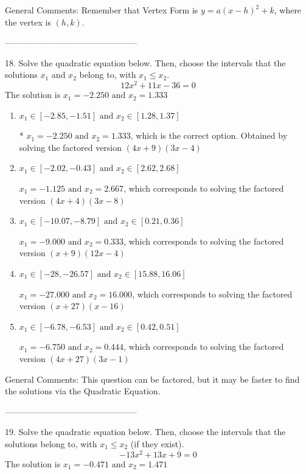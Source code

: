 \documentclass{extbook}[14pt]
\begin{document}
General Comments: Remember that Vertex Form is $y = a(x-h)^2+k$, where the vertex is $(h, k)$.

-----------------------------------------------

18. Solve the quadratic equation below. Then, choose the intervals that the solutions $x_1$ and $x_2$ belong to, with $x_1 \leq x_2$.
\[ 12x^{2} +11 x -36 = 0 \] 
The solution is $ x_1 = -2.250 \text{ and } x_2 = 1.333 $ 

\begin{enumerate}[label=\Alph*.] 
\item $ x_1 \in [-2.85, -1.51] \text{ and } x_2 \in [1.28, 1.37] $ 

 * $x_1 = -2.250 \text{ and } x_2 = 1.333$, which is the correct option. Obtained by solving the factored version $(4x + 9)(3x -4)$ 
\item $ x_1 \in [-2.02, -0.43] \text{ and } x_2 \in [2.62, 2.68] $ 

 $x_1 = -1.125 \text{ and } x_2 = 2.667$, which corresponds to solving the factored version $(4x + 4)(3x -8)$ 
\item $ x_1 \in [-10.07, -8.79] \text{ and } x_2 \in [0.21, 0.36] $ 

 $x_1 = -9.000 \text{ and } x_2 = 0.333$, which corresponds to solving the factored version $(x + 9)(12x -4)$ 
\item $ x_1 \in [-28, -26.57] \text{ and } x_2 \in [15.88, 16.06] $ 

 $x_1 = -27.000 \text{ and } x_2 = 16.000$, which corresponds to solving the factored version $(x + 27)(x -16)$ 
\item $ x_1 \in [-6.78, -6.53] \text{ and } x_2 \in [0.42, 0.51] $ 

 $x_1 = -6.750 \text{ and } x_2 = 0.444$, which corresponds to solving the factored version $(4x + 27)(3x -1)$ 
\end{enumerate} 
 
General Comments: This question can be factored, but it may be faster to find the solutions via the Quadratic Equation.

-----------------------------------------------

19. Solve the quadratic equation below. Then, choose the intervals that the solutions belong to, with $x_1 \leq x_2$ (if they exist).
\[ -13x^{2} +13 x + 9 = 0 \] 
The solution is $ x_1 = -0.471 \text{ and } x_2 = 1.471 $ 
\end{document}
